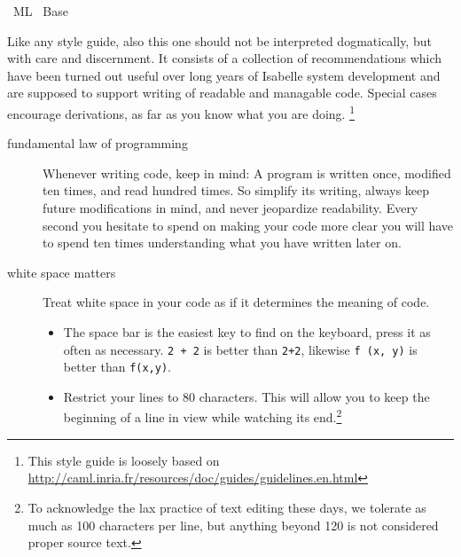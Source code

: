 %
\begin{isabellebody}%
\def\isabellecontext{ML}%
%
\isadelimtheory
%
\endisadelimtheory
%
\isatagtheory
{}\isamarkupfalse%
\ {\isachardoublequoteopen}ML{\isachardoublequoteclose}\isanewline
{}\ Base\isanewline
{}%
\endisatagtheory
{\isafoldtheory}%
%
\isadelimtheory
%
\endisadelimtheory
%
\isamarkuptrue%
%
\isamarkuptrue%
%
\begin{isamarkuptext}%
Like any style guide, also this one should not be interpreted dogmatically, but
  with care and discernment.  It consists of a collection of
  recommendations which have been turned out useful over long years of
  Isabelle system development and are supposed to support writing of readable
  and managable code.  Special cases encourage derivations,
  as far as you know what you are doing.
  \footnote{This style guide is loosely based on
  \url{http://caml.inria.fr/resources/doc/guides/guidelines.en.html}}

  \begin{description}

    \item[fundamental law of programming]
      Whenever writing code, keep in mind: A program is
      written once, modified ten times, and read
      hundred times.  So simplify its writing,
      always keep future modifications in mind,
      and never jeopardize readability.  Every second you hesitate
      to spend on making your code more clear you will
      have to spend ten times understanding what you have
      written later on.

    \item[white space matters]
      Treat white space in your code as if it determines
      the meaning of code.

      \begin{itemize}

        \item The space bar is the easiest key to find on the keyboard,
          press it as often as necessary. \verb|2 + 2| is better
          than \verb|2+2|, likewise \verb|f (x, y)| is
          better than \verb|f(x,y)|.

        \item Restrict your lines to 80 characters.  This will allow
          you to keep the beginning of a line in view while watching
          its end.\footnote{To acknowledge the lax practice of
          text editing these days, we tolerate as much as 100
          characters per line, but anything beyond 120 is not
          considered proper source text.}


\end{itemize}
\end{description}
\end{isamarkuptext}
\end{isabellebody}
